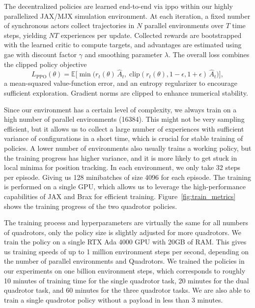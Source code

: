 The decentralized policies are learned end-to-end via \gls{ippo} within our highly parallelized JAX/MJX simulation environment. At each iteration, a fixed number of synchronous actors collect trajectories in $N$ parallel environments over $T$ time steps, yielding $NT$ experiences per update. Collected rewards are bootstrapped with the learned critic to compute targets, and advantages are estimated using \gls{gae} with discount factor $\gamma$ and smoothing parameter $\lambda$. The overall loss combines the clipped policy objective
\begin{equation}
L_{\mathrm{PPO}}(\theta) = \mathbb{E}\!\bigl[\min\bigl(r_t(\theta)\,\hat{A}_t,\;\mathrm{clip}(r_t(\theta),1-\epsilon,1+\epsilon)\,\hat{A}_t\bigr)\bigr],
\end{equation}
a mean-squared value-function error, and an entropy regularizer to encourage sufficient exploration. Gradient norms are clipped to enhance numerical stability.

Since our environment has a certain level of complexity, we always train on a high number of parallel environments (16384). This might not be very sampling efficient, but it allows us to collect a large number of experiences with sufficient variance of configurations in a short time, which is crucial for stable training of policies. A lower number of environments also usually trains a working policy, but the training progress has higher variance, and it is more likely to get stuck in local minima for position tracking. In each environment, we only take 32 steps per episode. Giving us 128 minibatches of size 4096 for each episode. The training is performed on a single GPU, which allows us to leverage the high-performance capabilities of JAX and Brax for efficient training. Figure~\ref{fig:train_metrics} shows the training progress of the two quadrotor policies.%

The training process and hyperparameters are virtually the same for all numbers of quadrotors, only the policy size is slightly adjusted for more quadrotors. We train the policy on a single RTX Ada 4000 GPU with 20GB of RAM. This gives us training speeds of up to 1 million environment steps per second, depending on the number of parallel environments and Quadrotors. We trained the policies in our experiments on one billion environment steps, which corresponds to roughly 10 minutes of training time for the single quadrotor task, 20 minutes for the dual quadrotor task, and 60 minutes for the three quadrotor tasks. We are also able to train a single quadrotor policy without a payload in less than 3 minutes.

